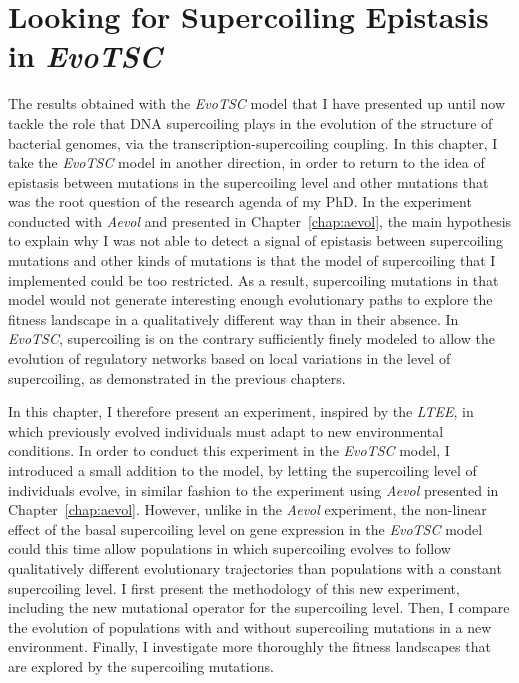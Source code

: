 \chapter{Looking for Supercoiling Epistasis in \emph{EvoTSC}}
\label{chap:epistasis}

The results obtained with the \emph{EvoTSC} model that I have presented up until now tackle the role that DNA supercoiling plays in the evolution of the structure of bacterial genomes, via the transcription-supercoiling coupling.
In this chapter, I take the \emph{EvoTSC} model in another direction, in order to return to the idea of epistasis between mutations in the supercoiling level and other mutations that was the root question of the research agenda of my PhD.
In the experiment conducted with \emph{Aevol} and presented in Chapter~\ref{chap:aevol}, the main hypothesis to explain why I was not able to detect a signal of epistasis between supercoiling mutations and other kinds of mutations is that the model of supercoiling that I implemented could be too restricted.
As a result, supercoiling mutations in that model would not generate interesting enough evolutionary paths to explore the fitness landscape in a qualitatively different way than in their absence.
In \emph{EvoTSC}, supercoiling is on the contrary sufficiently finely modeled to allow the evolution of regulatory networks based on local variations in the level of supercoiling, as demonstrated in the previous chapters.

In this chapter, I therefore present an experiment, inspired by the \emph{LTEE}, in which previously evolved individuals must adapt to new environmental conditions.
In order to conduct this experiment in the \emph{EvoTSC} model, I introduced a small addition to the model, by letting the supercoiling level of individuals evolve, in similar fashion to the experiment using \emph{Aevol} presented in Chapter~\ref{chap:aevol}.
However, unlike in the \emph{Aevol} experiment, the non-linear effect of the basal supercoiling level on gene expression in the \emph{EvoTSC} model could this time allow populations in which supercoiling evolves to follow qualitatively different evolutionary trajectories than populations with a constant supercoiling level.
I first present the methodology of this new experiment, including  the new mutational operator for the supercoiling level.
Then, I compare the evolution of populations with and without supercoiling mutations in a new environment.
Finally, I investigate more thoroughly the fitness landscapes that are explored by the supercoiling mutations.


